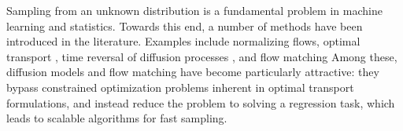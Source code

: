 \documentclass{article}
\begin{document}



Sampling from an unknown distribution is a fundamental problem in machine learning and statistics. Towards this end, a number of methods have been introduced in the literature. Examples include normalizing flows,  optimal transport \cite{onken2021ot}, time reversal of diffusion processes \cite{song2020score}, and flow matching\cite{lipmanflow,liu2022flow,albergo2023stochastic} Among these, diffusion models and flow matching have become particularly attractive: they bypass constrained optimization problems inherent in optimal transport formulations, and instead reduce the problem to solving a regression task, which leads to scalable algorithms for fast sampling.
\end{document}

